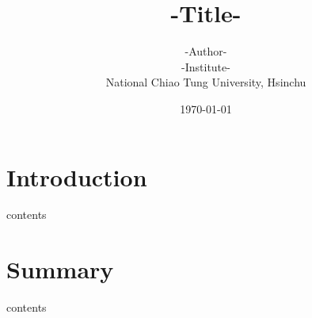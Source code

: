 \documentclass[landscape,headrule,footrule]{foils}
\begin{document}
\title       {-Title-}
\author      {\large -Author- \\[1em]
              -Institute- \\
              National Chiao Tung University, Hsinchu}
\date        {\today}
\MyLogo      {}
\Restriction {}
\rightfooter {\thepage}
\leftheader  {}
\maketitle
\tableofcontents

\section{Introduction}
\tableofcontents

\begin{frame}[\secname]
\begin{center}
contents
\end{center}
\end{frame}

\section{Summary}
\tableofcontents
\begin{frame}[\secname]
\begin{center}
contents
\end{center}
\end{frame}


\endslide
\end{document}
